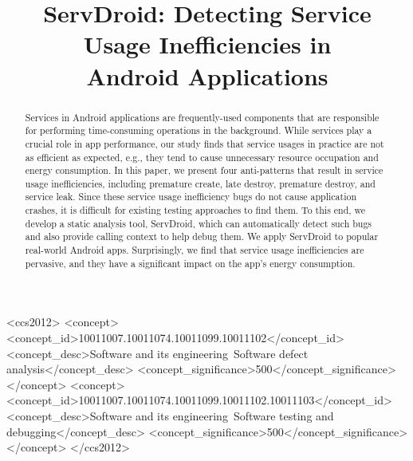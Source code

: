\documentclass[sigconf,review, anonymous]{acmart}
\begin{document}
\title{ServDroid: Detecting Service Usage Inefficiencies in\\  Android Applications}

\begin{abstract}
Services in Android applications are frequently-used components that are
responsible for performing time-consuming operations in the background. While
services play a crucial role in app performance, our study finds that service
usages in practice are not as efficient as expected, e.g., they tend to cause
unnecessary resource occupation and energy consumption. In this paper, we
present four anti-patterns that result in service usage inefficiencies,
including premature create, late destroy, premature destroy, and service leak.
Since these service usage inefficiency bugs do not cause application crashes, it
is difficult for existing testing approaches to find them.
To this end, we develop a static analysis tool, \textsf{ServDroid}, which can
automatically detect such bugs and also provide calling context to help
debug them. We apply \textsf{ServDroid} to popular real-world Android
apps. Surprisingly, we find that service usage inefficiencies are pervasive,
and they have a significant impact on the app's energy
consumption.
\end{abstract}

%
%
\begin{CCSXML}
<ccs2012>
<concept>
<concept_id>10011007.10011074.10011099.10011102</concept_id>
<concept_desc>Software and its engineering~Software defect analysis</concept_desc>
<concept_significance>500</concept_significance>
</concept>
<concept>
<concept_id>10011007.10011074.10011099.10011102.10011103</concept_id>
<concept_desc>Software and its engineering~Software testing and debugging</concept_desc>
<concept_significance>500</concept_significance>
</concept>
</ccs2012>
\end{CCSXML}
\end{document}
